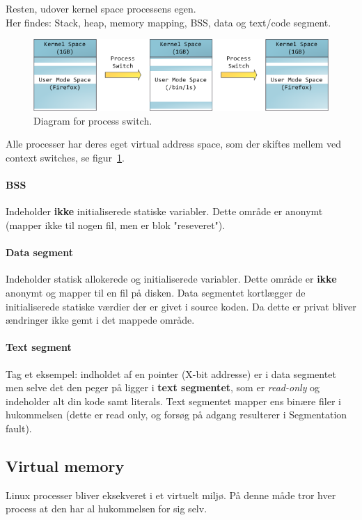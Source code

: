 Resten, udover kernel space processens egen.\\

Her findes: Stack, heap, memory mapping, BSS, data og text/code segment.

\begin{figure}[H]
	\centering
	\includegraphics[width=\linewidth]{figs/spm1/memoryspace}
	\caption{Diagram for process switch.}
	\label{fig:memoryspace}
\end{figure}

Alle processer har deres eget virtual address space, som der skiftes mellem ved context switches, se figur~\ref{fig:memoryspace}.

\paragraph{BSS}
Indeholder \textbf{ikke} initialiserede statiske variabler. Dette område er anonymt (mapper ikke til nogen fil, men er blok "reseveret").

\paragraph{Data segment}
Indeholder statisk allokerede og initialiserede variabler. Dette område er \textbf{ikke} anonymt og mapper til en fil på disken. Data segmentet kortlægger de initialiserede statiske værdier der er givet i source koden. Da dette er privat bliver ændringer ikke gemt i det mappede område.

\paragraph{Text segment}
Tag et eksempel: indholdet af en pointer (X-bit addresse) er i data segmentet men selve det den peger på ligger i \textbf{text segmentet}, som er \textit{read-only} og indeholder alt din kode samt literals. Text segmentet mapper ens binære filer i hukommelsen (dette er read only, og forsøg på adgang resulterer i Segmentation fault).

\subsection{Virtual memory}
Linux processer bliver eksekveret i et virtuelt miljø. På denne måde tror hver process at den har al hukommelsen for sig selv.\\

